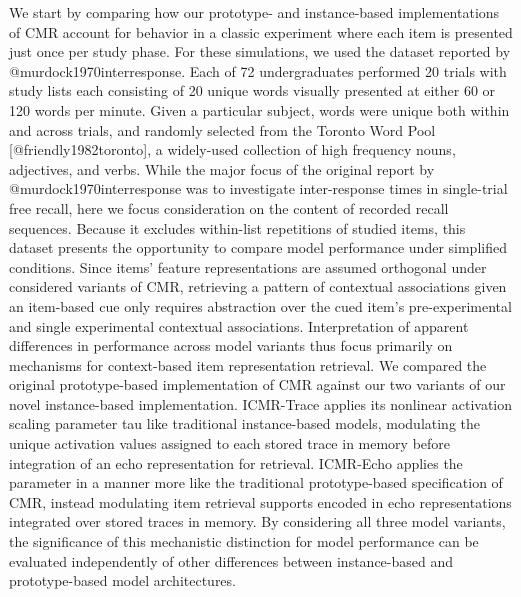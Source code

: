 We start by comparing how our prototype- and instance-based implementations of CMR account for behavior in a classic experiment where each item is presented just once per study phase. For these simulations, we used the dataset reported by @murdock1970interresponse. Each of 72 undergraduates performed 20 trials with study lists each consisting of 20 unique words visually presented at either 60 or 120 words per minute. Given a particular subject, words were unique both within and across trials, and randomly selected from the Toronto Word Pool [@friendly1982toronto], a widely-used collection of high frequency nouns, adjectives, and verbs.\markdownRendererInterblockSeparator
{}While the major focus of the original report by @murdock1970interresponse was to investigate inter-response times in single-trial free recall, here we focus consideration on the content of recorded recall sequences. Because it excludes within-list repetitions of studied items, this dataset presents the opportunity to compare model performance under simplified conditions. Since items' feature representations are assumed orthogonal under considered variants of CMR, retrieving a pattern of contextual associations given an item-based cue only requires abstraction over the cued item's pre-experimental and single experimental contextual associations. Interpretation of apparent differences in performance across model variants thus focus primarily on mechanisms for context-based item representation retrieval.\markdownRendererInterblockSeparator
{}We compared the original prototype-based implementation of CMR against our two variants of our novel instance-based implementation. ICMR-Trace applies its nonlinear activation scaling parameter \markdownRendererDollarSign{}\markdownRendererBackslash{}tau\markdownRendererDollarSign{} like traditional instance-based models, modulating the unique activation values assigned to each stored trace in memory before integration of an echo representation for retrieval. ICMR-Echo applies the parameter in a manner more like the traditional prototype-based specification of CMR, instead modulating item retrieval supports encoded in echo representations integrated over stored traces in memory. By considering all three model variants, the significance of this mechanistic distinction for model performance can be evaluated independently of other differences between instance-based and prototype-based model architectures.\markdownRendererInterblockSeparator
